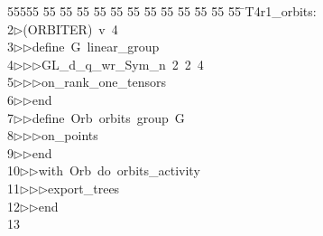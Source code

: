 %
%
\begin{tabbing}
55555 \= 55 \= 55 \= 55 \= 55 \= 55 \= 55 \= 55 \= 55 \= 55 \= 55 \= 55 \= 55 \= \>T4r1\_orbits:\\[0pt]
2\>$\triangleright$\>(ORBITER)\ v\ 4\ \\[0pt]
3\>$\triangleright$\>$\triangleright$\>define\ G\ linear\_group\ \\[0pt]
4\>$\triangleright$\>$\triangleright$\>$\triangleright$\>GL\_d\_q\_wr\_Sym\_n\ 2\ 2\ 4\ \\[0pt]
5\>$\triangleright$\>$\triangleright$\>$\triangleright$\>on\_rank\_one\_tensors\ \\[0pt]
6\>$\triangleright$\>$\triangleright$\>end\ \\[0pt]
7\>$\triangleright$\>$\triangleright$\>define\ Orb\ orbits\ group\ G\ \\[0pt]
8\>$\triangleright$\>$\triangleright$\>$\triangleright$\>on\_points\ \\[0pt]
9\>$\triangleright$\>$\triangleright$\>end\ \\[0pt]
10\>$\triangleright$\>$\triangleright$\>with\ Orb\ do\ orbits\_activity\ \\[0pt]
11\>$\triangleright$\>$\triangleright$\>$\triangleright$\>export\_trees\ \\[0pt]
12\>$\triangleright$\>$\triangleright$\>end\\[0pt]
13\>\end{tabbing}
